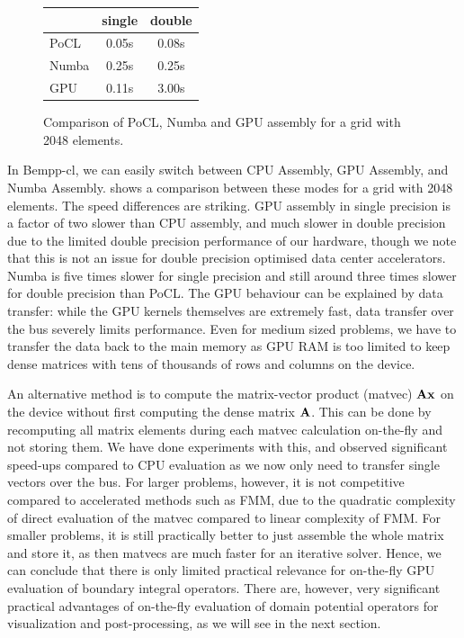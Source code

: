 \begin{figure}
\begin{center}
\begin{tabular}{l|c|c}
	        &   single      &    double\\
	        \hline
	 PoCL   &   0.05s       &    0.08s\\
	 Numba  &   0.25s       &    0.25s\\
	 GPU    &   0.11s       &    3.00s\\
\end{tabular}
\end{center}
\caption{Comparison of PoCL, Numba and GPU assembly for a grid with 2048 elements.}
\label{fig:cpu_gpu_numba_compare}
\end{figure}
In Bempp-cl, we can easily switch between CPU Assembly, GPU Assembly, and Numba Assembly.  shows a comparison between these modes for a grid with 2048 elements. The speed differences are striking. GPU assembly in single precision is a factor of two slower than CPU assembly, and much slower in double precision due to the limited double precision performance of our hardware, though we note that this is not an issue for double precision optimised data center accelerators. Numba is five times slower for single precision and still around three times slower for double precision than PoCL. The GPU behaviour can be explained by data transfer: while the GPU kernels themselves are extremely fast, data transfer over the bus severely limits performance. Even for medium sized problems, we have to transfer the data back to the main memory as GPU RAM is too limited to keep dense matrices with tens of thousands of rows and columns on the device.

An alternative method is to compute the matrix-vector product (matvec) $\mathbf{A}\mathbf{x}$ on the device without first computing the dense matrix $\mathbf{A}$. This can be done by recomputing all matrix elements during each matvec calculation on-the-fly and not storing them. We have done experiments with this, and observed significant speed-ups compared to CPU evaluation as we now only need to transfer single vectors over the bus. For larger problems, however, it is not competitive compared to accelerated methods such as FMM, due to the quadratic complexity of direct evaluation of the matvec compared to linear complexity of FMM. For smaller problems, it is still practically better to just assemble the whole matrix and store it, as then matvecs are much faster for an iterative solver. Hence, we can conclude that there is only limited practical relevance for on-the-fly GPU evaluation of boundary integral operators. There are, however, very significant practical advantages of on-the-fly evaluation of domain potential operators for visualization and post-processing, as we will see in the next section.

